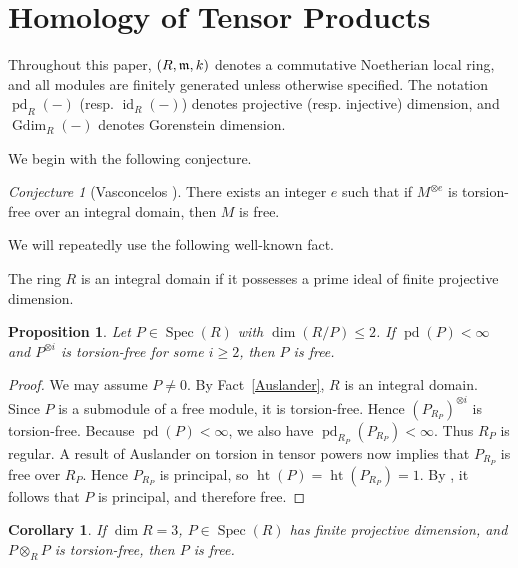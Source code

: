 \documentclass[11.05pt,a4paper]{amsart}
\newtheorem{proposition}[theorem]{Proposition}
\newtheorem{corollary}[theorem]{Corollary}
\theoremstyle{definition}
\theoremstyle{remark}
\newtheorem{conjecture}[theorem]{Conjecture}
\newcommand{\Spec}{\operatorname{Spec}}
\newcommand{\id}{\operatorname{id}}
\newcommand{\pd}{\operatorname{pd}}
\newcommand{\Gdim}{\operatorname{Gdim}}
\newcommand{\fm}{\frak{m}}
\begin{document}
\medskip
\section{Homology of Tensor Products}

Throughout this paper, \( (R,\fm,k) \) denotes a commutative Noetherian local ring, and all modules are finitely generated unless otherwise specified. The notation \( \pd_R(-) \) (resp. \( \id_R(-) \)) denotes projective (resp. injective) dimension, and \( \Gdim_R(-) \) denotes Gorenstein dimension.

We begin with the following conjecture.

\begin{conjecture}[Vasconcelos {\cite{2010}}]
	There exists an integer \( e \) such that if \( M^{\otimes e} \) is torsion-free over an integral domain, then \( M \) is free.
\end{conjecture}

We will repeatedly use the following well-known fact.

\begin{fact}\label{Auslander}
	The ring \( R \) is an integral domain if it possesses a prime ideal of finite projective dimension.
\end{fact}

\begin{proposition}
	Let \( P \in \Spec(R) \) with \( \dim(R/P) \leq 2 \). If \( \pd(P) < \infty \) and \( P^{\otimes i} \) is torsion-free for some \( i \ge 2 \), then \( P \) is free.
\end{proposition}

\begin{proof}
	We may assume \( P \neq 0 \). By Fact~\ref{Auslander}, \( R \) is an integral domain. Since \( P \) is a submodule of a free module, it is torsion-free. Hence \( (P_{R_P})^{\otimes i} \) is torsion-free. Because \( \pd(P) < \infty \), we also have \( \pd_{R_P}(P_{R_P}) < \infty \). Thus \( R_P \) is regular. A result of Auslander \cite{au} on torsion in tensor powers now implies that \( P_{R_P} \) is free over \( R_P \). Hence \( P_{R_P} \) is principal, so \( \operatorname{ht}(P) = \operatorname{ht}(P_{R_P}) = 1 \). By \cite[Corollary 1.2]{ABU}, it follows that \( P \) is principal, and therefore free.
\end{proof}

\begin{corollary}
	If \( \dim R = 3 \), \( P \in \Spec(R) \) has finite projective dimension, and \( P \otimes_R P \) is torsion-free, then \( P \) is free.
\end{corollary}
\end{document}
